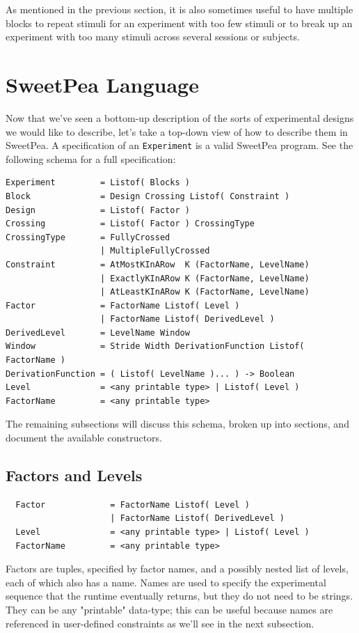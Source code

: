 As mentioned in the previous section, it is also sometimes useful to have multiple blocks to repeat stimuli for an experiment with too few stimuli or to break up an experiment with too many stimuli across several sessions or subjects.

\section{SweetPea Language}

Now that we've seen a bottom-up description of the sorts of experimental designs we would like to describe, let's take a top-down view of how to describe them in SweetPea. A specification of an \texttt{Experiment} is a valid SweetPea program. See the following schema for a full specification:

\begin{verbatim}
Experiment         = Listof( Blocks )
Block              = Design Crossing Listof( Constraint )
Design             = Listof( Factor )
Crossing           = Listof( Factor ) CrossingType
CrossingType       = FullyCrossed
                   | MultipleFullyCrossed
Constraint         = AtMostKInARow  K (FactorName, LevelName)
                   | ExactlyKInARow K (FactorName, LevelName)
                   | AtLeastKInARow K (FactorName, LevelName)
Factor             = FactorName Listof( Level )
                   | FactorName Listof( DerivedLevel )
DerivedLevel       = LevelName Window
Window             = Stride Width DerivationFunction Listof( FactorName )
DerivationFunction = ( Listof( LevelName )... ) -> Boolean
Level              = <any printable type> | Listof( Level )
FactorName         = <any printable type>
\end{verbatim}

The remaining subsections will discuss this schema, broken up into sections, and document the available constructors.

\subsection{Factors and Levels}

\begin{verbatim}
  Factor             = FactorName Listof( Level )
                     | FactorName Listof( DerivedLevel )
  Level              = <any printable type> | Listof( Level )
  FactorName         = <any printable type>
\end{verbatim}

Factors are tuples, specified by factor names, and a possibly nested list of levels, each of which also has a name. Names are used to specify the experimental sequence that the runtime eventually returns, but they do not need to be strings. They can be any "printable" data-type; this can be useful because names are referenced in user-defined constraints as we'll see in the next subsection.

